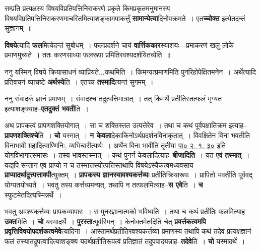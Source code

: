 \documentclass[article,12pt,a4paper]{memoir}
\begin{document}
	  \pstart सम्प्रति प्रत्यक्षस्य विषयविप्रतिपत्तिनिराकरणे प्रकृते किमप्रकृतमनुमानस्य विषयविप्रतिपत्तिनिराकरणमाचरितमित्याशङ्कामपाकर्त्तुं \textbf{सामान्येत्या}दिनोपक्रमते । एत\textbf{च्चोक्त} इत्येतदन्तं सुज्ञानम् ॥
	\pend
      

	  \pstart \textbf{विषये}त्यादि \textbf{फल}मित्येदन्तं सुबोधम् । फलप्रदर्शने चायं \textbf{वार्त्तिककार}स्याशयः—प्रमाकरणं खलु लोके प्रमाणमुच्यते । ततः करणसाध्या फलरूपा प्रमितिरवश्यदर्शयितव्येति ॥
	\pend
      

	  \pstart ननु यस्मिन् विषये क्रियासाधनं व्याप्रियते...कथमिति । किमन्यत्प्रमाणमिति पुनरिहोपेक्षितमनेन । अर्थेत्यादि प्रतिवचनं व्याचष्टे \textbf{अर्थस्ये}ति । एतच्च \textbf{तस्मादि}त्यन्तं सुगमम् ।
	\pend
      

	  \pstart ननु संवादकं ज्ञानं प्रमाणम् । संवादश्च तदुत्पत्तिमात्रात् । तत् किमर्थे प्रतीतिस्तत्फलं मृग्यत इत्याशङ्क्याह--\textbf{एतदुक्तं भवती}ति ।
	\pend

	  \pstart अथ प्रापकत्वं प्रापणशक्तियोगात् । सा च शक्तिस्तत उत्पत्तेरेव । तथा च कथं पूर्वपक्षातिक्रम इत्याह--\textbf{प्रापणशक्तिश्चे}ति । \textbf{चो} यस्मात् । \textbf{न केवला}देकाकिनोऽर्थप्रदर्शनविनाकृतात् । विवक्षितेन विना भवतीति विनाभावी ग्रहादित्वाण्णिनिः, व्यभिचारीत्यर्थः । अर्थेन विना भावीति तृतीया \href{http://sarit.indology.info/?cref=Pā.2.1.30}{पा० २. १. ३०} इति योगविभागात्समासः । तस्य भावस्तस्मात् । कथं पुनर्न केवलादित्याह--\textbf{बीजादिति} । यत एवं \textbf{तस्मात्} । यद्यपि सन्तान एव प्राप्यो न च तस्मात्तस्योत्पत्तिस्तथापि विषयेऽस्यैकत्वमध्यवसाय \textbf{प्राप्यादर्थादुत्त्पत्तावपी}त्युक्तम् । \textbf{प्रापकस्य ज्ञानस्यावश्यकर्त्तव्यः} प्रतीतिक्रियारूपः । प्रापितो भवतीति पूर्ववद् योग्यत\leavevmode{}योच्यते । भवतु तस्य कर्त्तव्यमन्यत्, तथापि न तत्फलमित्याह--\textbf{स एवे}ति । \textbf{च} स्फुटमेतदित्यस्मिन्नर्थे ।
	\pend
      

	  \pstart भवतु अवश्यकर्त्तव्यः प्रापकव्यापारः । स पुनरज्ञानात्मको भविष्यति । तथा च कथं प्रतीतिः फलमित्याह \textbf{उक्त}मिति । \textbf{चो} यस्मादर्थे । \textbf{पुरस्ता}त्पूर्वस्मिन् । केनोक्तमेतदिति चेत् \textbf{प्रवर्त्तकत्वमपि प्रवृत्तिविषयोपदर्शकत्वमेवे}त्यादिना । आस्तामर्थप्रतीतिरवश्यकर्त्तव्या प्रमाणस्य तथापि कथं तदेव प्रत्यक्षज्ञानं फलं तस्यातद्रूपत्वादित्याशङ्क्य यदर्थप्रतीतिरूपत्वं प्रतिज्ञातं तदुपपादयन्नाह--\textbf{तदेवे}ति । \textbf{चो} यस्मादर्थे ।
	\pend
      
\end{document}

